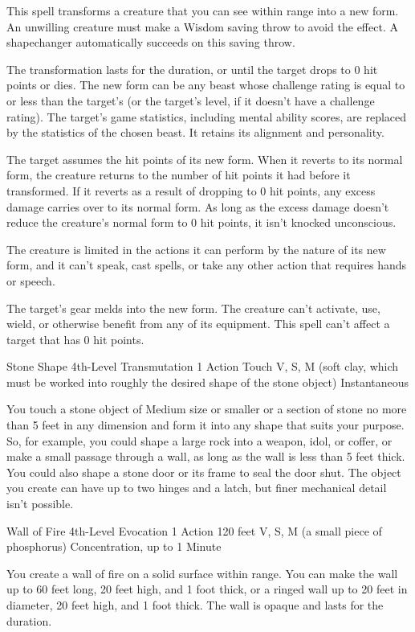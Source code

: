 {This spell transforms a creature that you can see within range into a new form. An unwilling creature must make a Wisdom saving throw to avoid the effect. A shapechanger automatically succeeds on this saving throw.

The transformation lasts for the duration, or until the target drops to 0 hit points or dies. The new form can be any beast whose challenge rating is equal to or less than the target’s (or the target’s level, if it doesn’t have a challenge rating). The target’s game statistics, including mental ability scores, are replaced by the statistics of the chosen beast. It retains its alignment and personality.

The target assumes the hit points of its new form. When it reverts to its normal form, the creature returns to the number of hit points it had before it transformed. If it reverts as a result of dropping to 0 hit points, any excess damage carries over to its normal form. As long as the excess damage doesn’t reduce the creature’s normal form to 0 hit points, it isn’t knocked unconscious.

The creature is limited in the actions it can perform by the nature of its new form, and it can’t speak, cast spells, or take any other action that requires hands or speech.

The target’s gear melds into the new form. The creature can’t activate, use, wield, or otherwise benefit from any of its equipment. This spell can’t affect a target that has 0 hit points.

\DndSpellHeader
  {Stone Shape}
  {4th-Level Transmutation}
  {1 Action}
  {Touch}
  {V, S, M (soft clay, which must be worked into roughly the desired shape of the stone object)}
  {Instantaneous}

You touch a stone object of Medium size or smaller or a section of stone no more than 5 feet in any dimension and form it into any shape that suits your purpose. So, for example, you could shape a large rock into a weapon, idol, or coffer, or make a small passage through a wall, as long as the wall is less than 5 feet thick. You could also shape a stone door or its frame to seal the door shut. The object you create can have up to two hinges and a latch, but finer mechanical detail isn’t possible.

\DndSpellHeader
  {Wall of Fire}
  {4th-Level Evocation}
  {1 Action}
  {120 feet}
  {V, S, M (a small piece of phosphorus)}
  {Concentration, up to 1 Minute}

You create a wall of fire on a solid surface within range. You can make the wall up to 60 feet long, 20 feet high, and 1 foot thick, or a ringed wall up to 20 feet in diameter, 20 feet high, and 1 foot thick. The wall is opaque and lasts for the duration.

}
